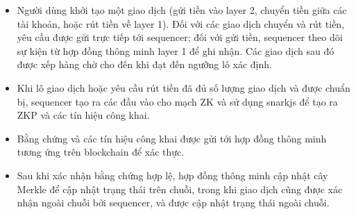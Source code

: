 \begin{itemize}
    \item Người dùng khởi tạo một giao dịch (gửi tiền vào layer 2, chuyển tiền giữa các tài khoản, hoặc rút tiền về layer 1). Đối với các giao dịch chuyển và rút tiền, yêu cầu được gửi trực tiếp tới sequencer; đối với gửi tiền, sequencer theo dõi sự kiện từ hợp đồng thông minh layer 1 để ghi nhận. Các giao dịch sau đó được xếp hàng chờ cho đến khi đạt đến ngưỡng lô xác định.
    \item Khi lô giao dịch hoặc yêu cầu rút tiền đã đủ số lượng giao dịch và được chuẩn bị, sequencer tạo ra các đầu vào cho mạch ZK và sử dụng snarkjs để tạo ra ZKP và các tín hiệu công khai.
    \item Bằng chứng và các tín hiệu công khai được gửi tới hợp đồng thông minh tương ứng trên blockchain để xác thực.
    \item Sau khi xác nhận bằng chứng hợp lệ, hợp đồng thông minh cập nhật cây Merkle để cập nhật trạng thái trên chuỗi, trong khi giao dịch cũng được xác nhận ngoài chuỗi bởi sequencer, và được cập nhật trạng thái ngoài chuỗi.
\end{itemize}





